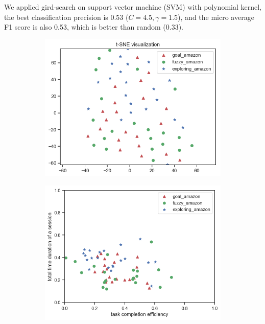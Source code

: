 We applied gird-search on support vector machine (SVM) with polynomial kernel,
the best classification precision is 0.53 ($C=4.5, \gamma = 1.5$),
and the micro average F1 score is also 0.53, which is better than random (0.33).

\begin{figure}[H]
    \centering

    \begin{subfigure}[b]{0.45\textwidth}
        \includegraphics[width=1\textwidth]{figures/tsne-amazon}
        \caption{}
        \label{fig:tsne-amazon}
    \end{subfigure}
    \begin{subfigure}[b]{0.45\textwidth}
        \includegraphics[width=1\textwidth]{figures/2d-eff-dur-amazon}

\end{subfigure}
\end{figure}
